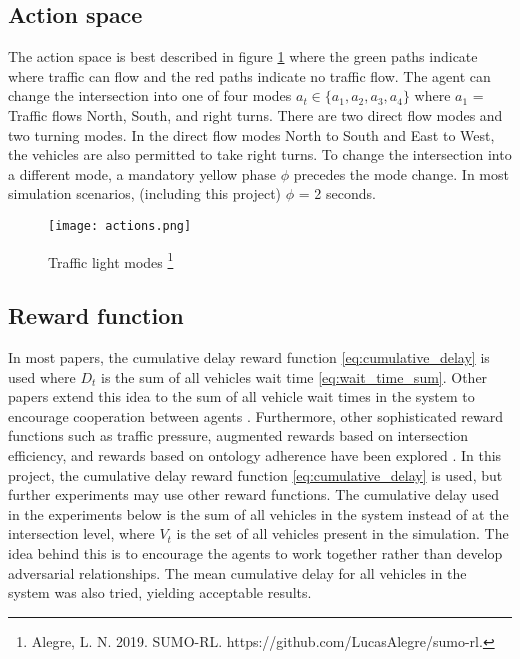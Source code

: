 \documentclass[letterpaper]{article} %
\begin{document}
\subsection{Action space}
The action space is best described in figure \ref{fig:action_space} where the green paths indicate where traffic can flow and the red paths indicate no traffic flow.
The agent can change the intersection into one of four modes \(a_t \in \{a_1, a_2, a_3, a_4\}\) where \(a_1\) = Traffic flows North, South, and right turns.
There are two direct flow modes and two turning modes.
In the direct flow modes North to South and East to West, the vehicles are also permitted to take right turns.
To change the intersection into a different mode, a mandatory yellow phase $\phi$ precedes the mode change.
In most simulation scenarios, (including this project) $\phi$ = 2 seconds.

\begin{figure}[htbp]
  \centering
  \texttt{[image: actions.png]}
  \caption{Traffic light modes \footnote{Alegre, L. N. 2019. SUMO-RL. https://github.com/LucasAlegre/sumo-rl.}}
  \label{fig:action_space}
\end{figure}

\subsection{Reward function}
In most papers, the cumulative delay reward function \ref{eq:cumulative_delay} is used where \(D_t\) is the sum of all vehicles wait time \ref{eq:wait_time_sum}.
Other papers extend this idea to the sum of all vehicle wait times in the system to encourage cooperation between agents \cite{10.3389/frai.2022.805823}.
Furthermore, other sophisticated reward functions such as traffic pressure, augmented rewards based on intersection efficiency, and rewards based on ontology adherence have been explored \cite{ault2021reinforcement} \cite{Ghanadbashi2023}.
In this project, the cumulative delay reward function \ref{eq:cumulative_delay} is used, but further experiments may use other reward functions.
The cumulative delay used in the experiments below is the sum of all vehicles in the system instead of at the intersection level, where \(V_t\) is the set of all vehicles present in the simulation.
The idea behind this is to encourage the agents to work together rather than develop adversarial relationships.
The mean cumulative delay for all vehicles in the system was also tried, yielding acceptable results.
\end{document}
